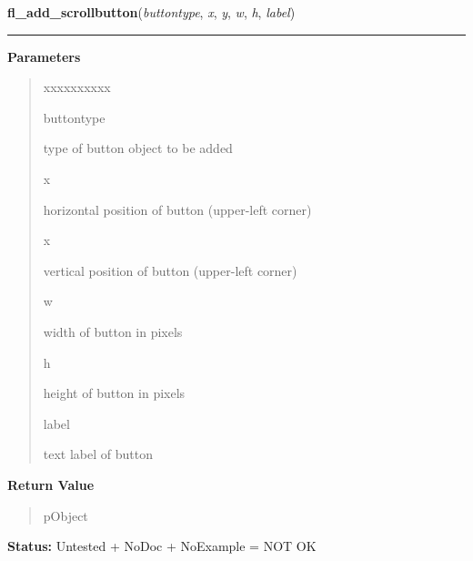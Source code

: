     \label{xformslib:library:fl_add_scrollbutton}

    \vspace{0.5ex}

\hspace{.8\funcindent}\begin{boxedminipage}{\funcwidth}

    \raggedright \textbf{fl\_add\_scrollbutton}(\textit{buttontype}, \textit{x}, \textit{y}, \textit{w}, \textit{h}, \textit{label})

    \vspace{-1.5ex}

    \rule{\textwidth}{0.5\fboxrule}
\setlength{\parskip}{2ex}
\setlength{\parskip}{1ex}
      \textbf{Parameters}
      \vspace{-1ex}

      \begin{quote}
        \begin{Ventry}{xxxxxxxxxx}

          \item[buttontype]

          type of button object to be added

          \item[x]

          horizontal position of button (upper-left corner)

          \item[x]

          vertical position of button (upper-left corner)

          \item[w]

          width of button in pixels

          \item[h]

          height of button in pixels

          \item[label]

          text label of button

        \end{Ventry}

      \end{quote}

      \textbf{Return Value}
    \vspace{-1ex}

      \begin{quote}
      pObject

      \end{quote}

\textbf{Status:} Untested + NoDoc + NoExample = NOT OK



    \end{boxedminipage}

